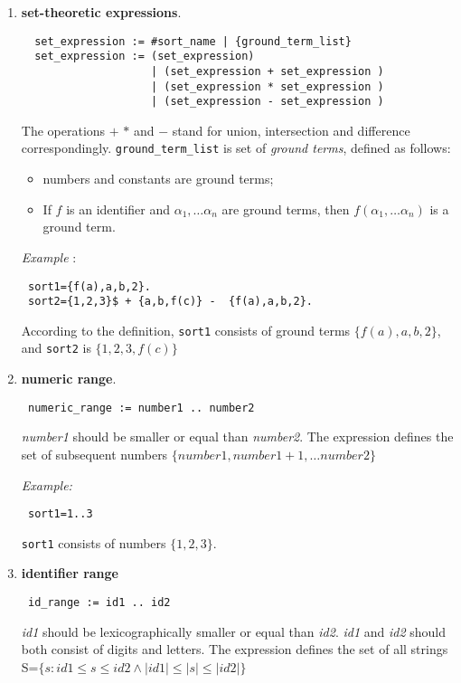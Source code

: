 \documentclass[12pt, letterpaper]{article}
\begin{document}
\begin{enumerate}
 \item \textbf{set-theoretic expressions}.
 \begin{verbatim}
  set_expression := #sort_name | {ground_term_list}
  set_expression := (set_expression) 
                    | (set_expression + set_expression ) 
                    | (set_expression * set_expression ) 
                    | (set_expression - set_expression )
  \end{verbatim}
The operations $+$ $*$ and $-$ stand for union, intersection and difference correspondingly.
\texttt{ground\_term\_list} is set of \textit{ground terms}, defined as follows:
\begin{itemize}
 \item numbers and constants are ground terms;
 \item If $f$ is an identifier and $\alpha_1, \dots \alpha_n$ are ground terms, then $f(\alpha_1,\dots \alpha_n)$ is a ground term.
\end{itemize}
\textit{Example} : 
\begin{verbatim}
 sort1={f(a),a,b,2}.
 sort2={1,2,3}$ + {a,b,f(c)} -  {f(a),a,b,2}.
\end{verbatim}
According to the definition, \texttt{sort1} consists of ground terms $\{f(a),a,b,2\}$, and \texttt{sort2} is $\{1,2,3,f(c)\}$ 

\item \textbf{numeric range}.
\begin{verbatim}
 numeric_range := number1 .. number2
\end{verbatim}

\textit{number1} should be smaller or equal than \textit{number2}. The expression defines the set 
of subsequent numbers $\{number1, number1+1, \dots number2\}$

\textit{Example:}

\begin{verbatim}
 sort1=1..3
\end{verbatim}
\texttt{sort1} consists of numbers $\{1,2,3\}$.


\item \textbf{identifier range}


\begin{verbatim}
 id_range := id1 .. id2
\end{verbatim}

\textit{id1} should be lexicographically smaller or equal than \textit{id2}. 
\textit{id1} and \textit{id2} should both consist of digits and letters.
The expression defines the set of all strings \\ S=$\{s: id1\leq s \leq id2 \land |id1|\leq |s| \leq |id2|\}$




\end{enumerate}
\end{document}
